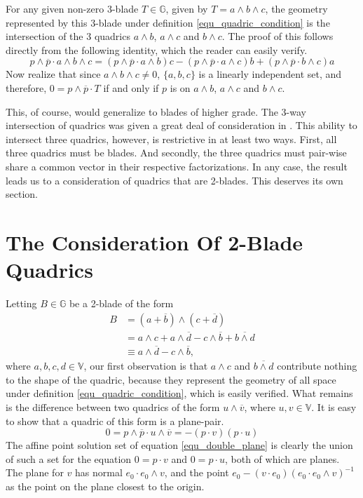 \documentclass{birkjour}
\theoremstyle{definition}
\theoremstyle{remark}
\numberwithin{equation}{section}
\newcommand{\G}{\mathbb{G}}
\newcommand{\V}{\mathbb{V}}
\begin{document}
For any given non-zero 3-blade $T\in\G$, given by $T=a\wedge b\wedge c$, the
geometry represented by this 3-blade under definition \eqref{equ_quadric_condition} is the intersection
of the 3 quadrics $a\wedge b$, $a\wedge c$ and $b\wedge c$.
The proof of this follows directly from the following identity, which the reader can easily verify.
\begin{equation}
p\wedge\overline{p}\cdot a\wedge b\wedge c
 = (p\wedge\overline{p}\cdot a\wedge b)c
 - (p\wedge\overline{p}\cdot a\wedge c)b
 + (p\wedge\overline{p}\cdot b\wedge c)a
\end{equation}
Now realize that since $a\wedge b\wedge c\neq 0$, $\{a,b,c\}$ is a linearly
independent set, and therefore, $0=p\wedge\overline{p}\cdot T$ if and
only if $p$ is on $a\wedge b$, $a\wedge c$ and $b\wedge c$.

This, of course, would generalize to blades of higher grade.  The 3-way intersection
of quadrics was given a great deal of consideration in \cite{ZhiqiangXu05}.
This ability to intersect three quadrics, however, is restrictive in at least
two ways.  First, all three quadrics must be blades.   And secondly, the
three quadrics must pair-wise share a common vector in their respective factorizations.
In any case, the result leads us to a consideration
of quadrics that are 2-blades.  This deserves its own section.

\section{The Consideration Of 2-Blade Quadrics}

Letting $B\in\G$ be a 2-blade of the form
\begin{align}\label{equ_two_blade_quadric}
B &= (a+\overline{b})\wedge(c+\overline{d}) \\
 &= a\wedge c + a\wedge\overline{d} - c\wedge\overline{b} + \overline{b\wedge d} \\
 &\equiv a\wedge\overline{d} - c\wedge\overline{b},
\end{align}
where $a,b,c,d\in\V$, our first observation is that $a\wedge c$ and $\overline{b\wedge d}$ contribute nothing
to the shape of the quadric, because they represent the geometry of all space under
definition \eqref{equ_quadric_condition}, which is easily verified.  What remains is the difference
between two quadrics of the form $u\wedge\overline{v}$, where $u,v\in\V$.  It is
easy to show that a quadric of this form is a plane-pair.
\begin{equation}\label{equ_double_plane}
0 = p\wedge\overline{p}\cdot u\wedge\overline{v} = -(p\cdot v)(p\cdot u)
\end{equation}
The affine point solution set of equation \eqref{equ_double_plane} is
clearly the union of such a set for the equation $0=p\cdot v$ and $0=p\cdot u$,
both of which are planes.  The plane for $v$ has normal $e_0\cdot e_0\wedge v$,
and the point $e_0-(v\cdot e_0)(e_0\cdot e_0\wedge v)^{-1}$ as the point on the plane closest to the origin.
\end{document}
